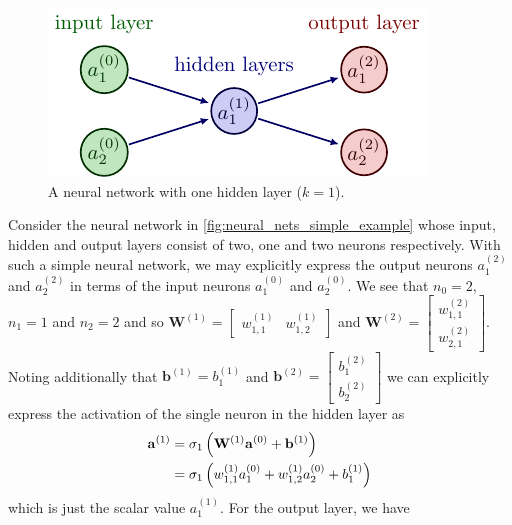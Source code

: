 \documentclass[11pt]{article}
\begin{document}
\begin{figure}[t]
    \centering
    \includegraphics{./figures/neural_nets/MLP_2.pdf}
    \caption{A neural network with one hidden layer ($k=1$). }
    \label{fig:neural_nets_simple_example}
\end{figure}

Consider the neural network in \autoref{fig:neural_nets_simple_example} whose input, hidden and output layers consist of two, one and two neurons respectively. With such a simple neural network, we may explicitly express the output neurons $a_1^{(2)}$ and $a_2^{(2)}$ in terms of the input neurons $a_1^{(0)}$ and $a_2^{(0)}$. We see that $n_0=2$, $n_1=1$ and $n_2=2$ and so
$\mathbf{W}^{(1)}=
\begin{bmatrix}
    w_{1,1}^{(1)} & w_{1,2}^{(1)}
\end{bmatrix}
$
and
$\mathbf{W}^{(2)}=
\begin{bmatrix}
    w_{1,1}^{(2)}\\
    w_{2,1}^{(2)}
\end{bmatrix}.
$
Noting additionally that $\mathbf{b}^{(1)}=b_1^{(1)}$ and
$\mathbf{b}^{(2)}=
\begin{bmatrix}
    b_{1}^{(2)}\\
    b_{2}^{(2)}
\end{bmatrix}$
we can explicitly express the activation of the single neuron in the hidden layer as
\begin{align*}
\mathbf{a}^{(1)}
&=
\sigma_1\left(\mathbf{W}^{(1)}\mathbf{a}^{(0)}+\mathbf{b}^{(1)}\right)\\
&=
\sigma_1\left(w_{1,1}^{(1)}a_1^{(0)}+w_{1,2}^{(1)}a_2^{(0)}+b_1^{(1)}\right)
\end{align*}
which is just the scalar value $a_1^{(1)}$. For the output layer, we have
\end{document}
